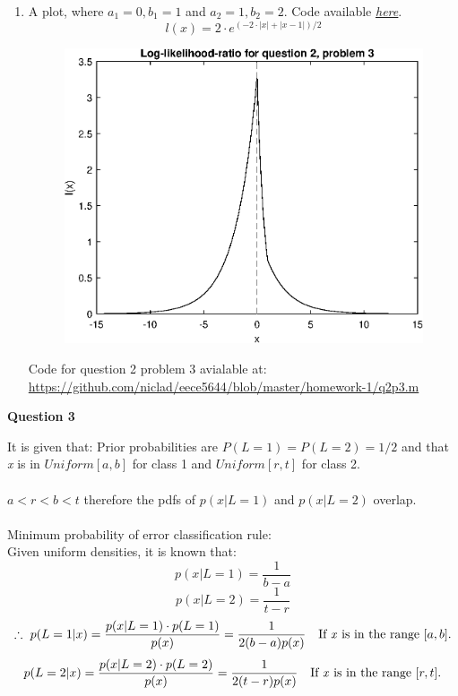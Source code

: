 \documentclass[12pt,A4]{article}
\begin{document}
\begin{enumerate}
    \item A plot, where \(a_1 = 0, b_1 = 1\) and \(a_2 = 1, b_2 = 2\). Code available \href{https://github.com/niclad/eece5644/blob/master/homework-1/q2p3.m}{\textit{\underline{here}}}.
        $$l(x) = 2 \cdot e^{(-2\cdot|x|+|x-1|)/2}$$
        \begin{figure}[h]
            \centering
            \includegraphics[scale=0.75]{q2p3.eps}
            \label{fig:my_label}
        \end{figure}
        \begin{center}
            Code for question 2 problem 3 avialable at: \url{https://github.com/niclad/eece5644/blob/master/homework-1/q2p3.m}
        \end{center}
\end{enumerate}{}

\textbf{Question 3}

It is given that: Prior probabilities are \(P(L=1) = P(L=2) = 1/2\) and that \textit{x} is in \(Uniform[a, b]\) for class 1 and \(Uniform[r, t]\) for class 2. \\\\
\(a < r < b < t\) therefore the pdfs of $p(x|L=1)$ and $p(x|L=2)$ overlap.\\\\
Minimum probability of error classification rule: \\

Given uniform densities, it is known that:
$$p(x|L=1)=\frac{1}{b-a}$$
$$p(x|L=2)=\frac{1}{t-r}$$
\begin{equation} \label{eq:1}
    \therefore \ p(L=1|x)=\frac{p(x|L=1)\cdot p(L=1)}{p(x)}=\frac{1}{2(b-a)p(x)} \quad \textrm{If \textit{x} is in the range $[a, b]$.}
\end{equation}
\begin{equation} \label{eq:2}
    p(L=2|x)=\frac{p(x|L=2)\cdot p(L=2)}{p(x)}=\frac{1}{2(t-r)p(x)} \quad \textrm{If \textit{x} is in the range $[r, t]$.}
\end{equation}
\end{document}
